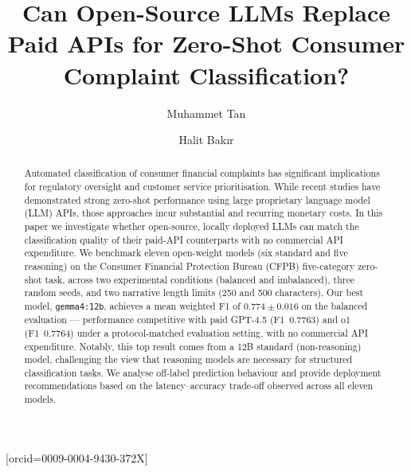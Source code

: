 \documentclass[a4paper,fleqn]{cas-dc}
\begin{document}
\let\WriteBookmarks\relax
\def\floatpagepagefraction{1}
\def\textpagefraction{.001}


\title[mode=title]{Can Open-Source LLMs Replace Paid APIs for Zero-Shot Consumer Complaint Classification?}

\author[1]{Muhammet Tan}[orcid=0009-0004-9430-372X]
\cormark[1]


\author[1]{Halit Bak{\i}r}


\begin{abstract}
Automated classification of consumer financial complaints has significant
implications for regulatory oversight and customer service prioritisation.
While recent studies have demonstrated strong zero-shot performance using
large proprietary language model (LLM) APIs, those approaches incur
substantial and recurring monetary costs. In this paper we investigate
whether open-source, locally deployed LLMs can match the classification
quality of their paid-API counterparts with no commercial API expenditure. We benchmark
eleven open-weight models (six standard and five reasoning) on the
Consumer Financial Protection Bureau (CFPB) five-category zero-shot
task, across two experimental conditions (balanced and imbalanced),
three random seeds, and two narrative length limits (250 and 500
characters). Our best model, \texttt{gemma4:12b}, achieves a mean
weighted F1 of $0.774 \pm 0.016$ on the balanced evaluation ---
performance competitive with paid GPT-4.5 (F1~0.7763) and o1
(F1~0.7764) under a protocol-matched evaluation setting,
with no commercial API expenditure. Notably, this top result comes from a 12B standard
(non-reasoning) model, challenging the view that reasoning models are
necessary for structured classification tasks. We analyse off-label
prediction behaviour and provide deployment recommendations based on
the latency--accuracy trade-off observed across all eleven models.
\end{abstract}
\end{document}
